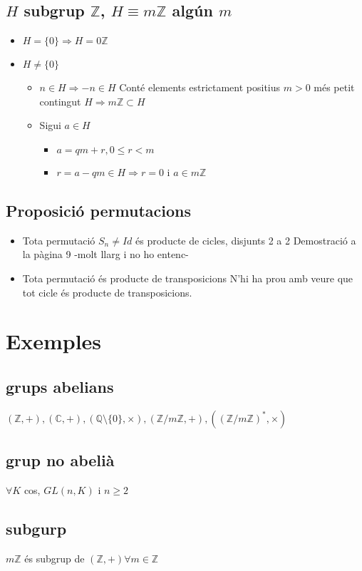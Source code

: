 \documentclass{article}
\newcommand{\Z}{\mathbb{Z}}
\newcommand{\Q}{\mathbb{Q}}
\newcommand{\C}{\mathbb{C}}
\begin{document}
\subsection{$H$ subgrup $\Z$, $H \equiv m\Z$ algún $m$}
\begin{itemize}
\item $H = \{0\} \Rightarrow H = 0 \Z$
\item $H \neq \{0\}$
	\begin{itemize}
	\item $n \in H \Rightarrow -n \in H$
		\subitem Conté elements estrictament positius
		\subitem $m > 0$ més petit contingut $H \Rightarrow m\Z \subset H$
	\item Sigui $a \in H$
		\begin{itemize}
		\item $a = qm + r, 0 \le r < m$
		\item $r = a - qm \in H \Rightarrow r = 0$ i $a \in m\Z$
		\end{itemize}
	\end{itemize}
\end{itemize}
\subsection{Proposició permutacions}
\begin{itemize}
\item Tota permutació $S_n \neq Id$ és producte de cicles, disjunts 2 a 2
	\subitem Demostració a la pàgina 9 -molt llarg i no ho entenc-
\item Tota permutació és producte de transposicions
	\subitem N'hi ha prou amb veure que tot cicle és producte de transposicions.
\end{itemize}

\newpage\section{Exemples}
\subsection{grups abelians}
$(\Z, +), (\C, +), (\Q\setminus\{0\}, \times), (\Z/m\Z, +), ((\Z/m\Z)^*, \times)$
\subsection{grup no abelià}
$\forall K$ cos, $GL(n, K)$ i $n \ge 2$
\subsection{subgurp}
$m\Z$ és subgrup de $(\Z, +) \forall m \in \Z$
\end{document}
